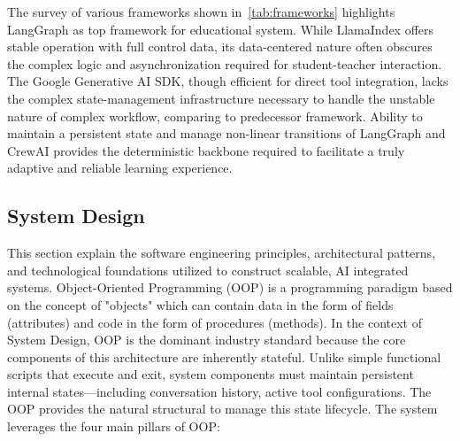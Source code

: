 The survey of various frameworks shown in~\ref{tab:frameworks} highlights LangGraph as top framework for educational system. While LlamaIndex offers stable operation with full control data, 
its data-centered nature often obscures the complex logic and asynchronization required for student-teacher interaction. 
The Google Generative AI SDK, though efficient for direct tool integration, lacks the complex state-management infrastructure necessary to handle the unstable nature of 
complex workflow, comparing to predecessor framework. Ability to maintain a persistent state and manage non-linear transitions of LangGraph and CrewAI provides the 
deterministic backbone required to facilitate a truly adaptive and reliable learning experience.
\subsection{System Design}

This section explain the software engineering principles, architectural patterns, and technological foundations utilized to construct  
scalable, AI integrated systems. 
Object-Oriented Programming (OOP) is a programming paradigm based on the concept of "objects" which can contain data in the form of fields (attributes) and code in the form of procedures (methods). 
In the context of System Design, OOP is the dominant industry standard because the core components of this architecture are inherently stateful. Unlike simple functional scripts that execute and exit, system components must maintain persistent internal states—including conversation history, active tool configurations. The OOP provides the natural structural to manage this state lifecycle. The system leverages the four main pillars of OOP:

